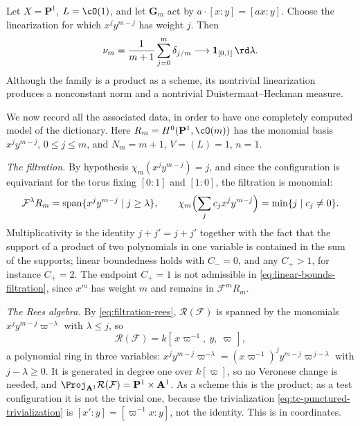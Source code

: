 \begin{example}
\label{ex:p1-product-dh}
Let $X=\mathbf P^1$, $L=\cO(1)$, and let
$\mathbf G_m$ act by $a\cdot[x:y]=[ax:y]$.  Choose the linearization for
which $x^jy^{m-j}$ has weight $j$.  Then
\[
 \nu_m=\frac1{m+1}\sum_{j=0}^m\delta_{j/m}
       \longrightarrow \mathbf 1_{[0,1]}\,\rd \lambda .
\]
Although the family is a product as a scheme, its nontrivial linearization
produces a nonconstant norm and a nontrivial Duistermaat--Heckman measure.

We now record all the associated data, in order to have one completely
computed model of the dictionary.  Here $R_m=H^0(\mathbf P^1,\cO(m))$ has
the monomial basis $x^jy^{m-j}$, $0\leq j\leq m$, and $N_m=m+1$,
$V=(L)=1$, $n=1$.

\emph{The filtration.}  By hypothesis $\chi_m(x^jy^{m-j})=j$, and since
the configuration is equivariant for the torus fixing $[0:1]$ and
$[1:0]$, the filtration is monomial:
\begin{equation}
\label{eq:ch33-p1-product-filtration}
 \mathcal F^\lambda R_m
 =\operatorname{span}\{x^jy^{m-j}\mid j\geq\lambda\},
 \qquad
 \chi_m\Bigl(\sum_j c_jx^jy^{m-j}\Bigr)=\min\{j\mid c_j\ne0\}.
\end{equation}
Multiplicativity is the identity $j+j'=j+j'$ together with the fact that
the support of a product of two polynomials in one variable is contained in
the sum of the supports; linear boundedness holds with $C_-=0$,
and any $C_+>1$, for instance $C_+=2$.  The endpoint $C_+=1$ is not
admissible in \eqref{eq:linear-bounds-filtration}, since $x^m$ has weight
$m$ and remains in $\mathcal F^mR_m$.

\emph{The Rees algebra.}  By \eqref{eq:filtration-rees}, $\mathcal
R(\mathcal F)$ is spanned by the monomials
$x^jy^{m-j}\varpi^{-\lambda}$ with $\lambda\leq j$, so
\begin{equation}
\label{eq:ch33-p1-product-rees}
 \mathcal R(\mathcal F)=k[\,x\varpi^{-1},\ y,\ \varpi\,],
\end{equation}
a polynomial ring in three variables:
$x^jy^{m-j}\varpi^{-\lambda}
=(x\varpi^{-1})^{j}y^{m-j}\varpi^{\,j-\lambda}$ with $j-\lambda\geq0$.
It is generated in degree one over $k[\varpi]$, so no Veronese change is
needed, and
$\Proj_{\mathbf A^1}\mathcal R(\mathcal F)=\mathbf P^1\times\mathbf A^1$.
As a scheme this is the product; as a test configuration it is not the
trivial one, because the trivialization
\eqref{eq:tc-punctured-trivialization} is
$[x':y]=[\varpi^{-1}x:y]$, not the identity.  This is
 in coordinates.


\end{example}
